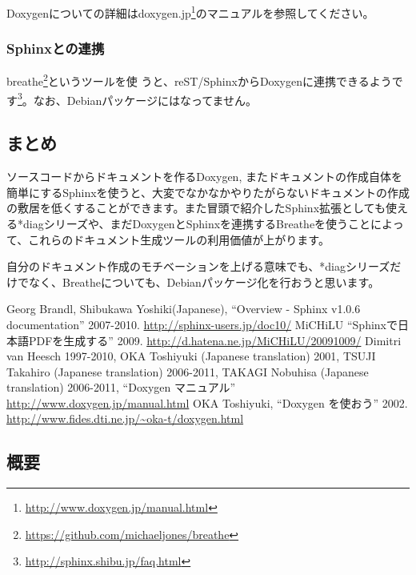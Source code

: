 \documentclass[mingoth,a4paper]{jsarticle}
\begin{document}
Doxygenについての詳細はdoxygen.jp\footnote{\url{http://www.doxygen.jp/manual.html}}のマニュアルを参照してください。

\subsubsection{Sphinxとの連携}

breathe\footnote{\url{https://github.com/michaeljones/breathe}}というツールを使
うと、reST/SphinxからDoxygenに連携できるようです\footnote{\url{http://sphinx.shibu.jp/faq.html}}。なお、Debianパッケージにはなってません。

\subsection{まとめ}
ソースコードからドキュメントを作るDoxygen, またドキュメントの作成自体を簡単にするSphinxを使うと、大変でなかなかやりたがらないドキュメントの作成の敷居を低くすることができます。また冒頭で紹介したSphinx拡張としても使える*diagシリーズや、まだDoxygenとSphinxを連携するBreatheを使うことによって、これらのドキュメント生成ツールの利用価値が上がります。

自分のドキュメント作成のモチベーションを上げる意味でも、*diagシリーズだけでなく、Breatheについても、Debianパッケージ化を行おうと思います。

{\footnotesize
\begin{thebibliography}{0}
  Georg Brandl, Shibukawa Yoshiki(Japanese),
	 ``Overview - Sphinx v1.0.6 documentation'' 2007-2010. \url{http://sphinx-users.jp/doc10/}
    MiCHiLU ``Sphinxで日本語PDFを生成する'' 2009. \url{http://d.hatena.ne.jp/MiCHiLU/20091009/}
    Dimitri van Heesch 1997-2010, OKA Toshiyuki (Japanese translation) 2001, TSUJI Takahiro (Japanese translation) 2006-2011,  TAKAGI Nobuhisa (Japanese translation) 2006-2011, ``Doxygen マニュアル'' \url{http://www.doxygen.jp/manual.html}
  OKA Toshiyuki, ``Doxygen を使おう'' 2002. \url{http://www.fides.dti.ne.jp/~oka-t/doxygen.html}
\end{thebibliography}
}

\subsection{概要}
\end{document}
